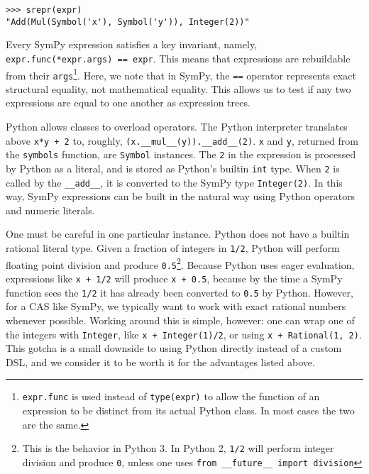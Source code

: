 \documentclass{article}
\begin{document}
\begin{verbatim}
>>> srepr(expr)
"Add(Mul(Symbol('x'), Symbol('y')), Integer(2))"
\end{verbatim}

Every SymPy expression satisfies a key invariant, namely,
\texttt{expr.func(*expr.args) == expr}. This means that expressions are
rebuildable from their \texttt{args}\footnote{\texttt{expr.func} is used
  instead of \texttt{type(expr)} to allow the function of an expression to be
  distinct from its actual Python class. In most cases the two are the same.}.
Here, we note that in SymPy, the \texttt{==} operator represents exact
structural equality, not mathematical equality. This allows us to test if any
two expressions are equal to one another as expression trees.

Python allows classes to overload operators. The Python interpreter translates
above \texttt{x*y + 2} to, roughly,
\verb|(x.__mul__(y)).__add__(2)|. \texttt{x} and \texttt{y}, returned from
the \texttt{symbols} function, are \texttt{Symbol} instances. The \texttt{2}
in the expression is processed by Python as a literal, and is stored as
Python's builtin \texttt{int} type. When \texttt{2} is called by the
\verb|__add__|, it is converted to the SymPy type \texttt{Integer(2)}. In
this way, SymPy expressions can be built in the natural way using Python
operators and numeric literals.

One must be careful in one particular instance. Python does not have a builtin
rational literal type. Given a fraction of integers in \texttt{1/2}, Python
will perform floating point division and produce \texttt{0.5}\footnote{This is
  the behavior in Python 3. In Python 2, \texttt{1/2} will perform integer
  division and produce \texttt{0}, unless one uses \texttt{from \_\_future\_\_
    import division}}. Because Python uses eager evaluation, expressions like
\texttt{x + 1/2} will produce \texttt{x + 0.5}, because by the time a SymPy
function sees the \texttt{1/2} it has already been converted to \texttt{0.5}
by Python. However, for a CAS like SymPy, we typically want to work with exact
rational numbers whenever possible. Working around this is simple, however:
one can wrap one of the integers with \texttt{Integer}, like \texttt{x +
  Integer(1)/2}, or using \texttt{x + Rational(1, 2)}. This gotcha is a small
downside to using Python directly instead of a custom DSL, and we consider it
to be worth it for the advantages listed above.

\end{document}
